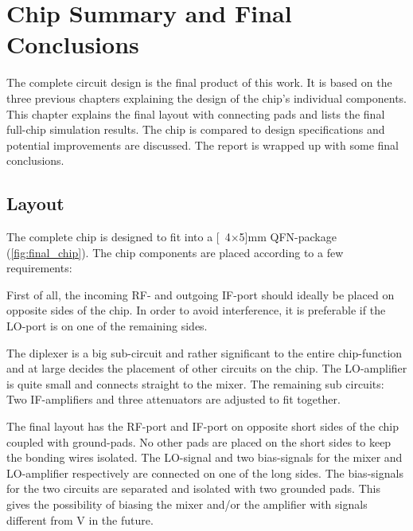 \chapter{Chip Summary and Final Conclusions}
	
		The complete circuit design is the final product of this work. It is based on the three previous chapters explaining the design of the chip's individual components. This chapter explains the final layout with connecting pads and lists the final full-chip simulation results. The chip is compared to design specifications and potential improvements are discussed. The report is wrapped up with some final conclusions.
		

	\section{Layout}
		The complete chip is designed to fit into a \unit[4$\times$5]{mm} QFN-package (\autoref{fig:final_chip}). The chip components are placed according to a few requirements:

		First of all, the incoming RF- and outgoing IF-port should ideally be placed on opposite sides of the chip. In order to avoid interference, it is preferable if the LO-port is on one of the remaining sides. %

		The diplexer is a big sub-circuit and rather significant to the entire chip-function and at large decides the placement of other circuits on the chip. The LO-amplifier is quite small and connects straight to the mixer. The remaining sub circuits: Two IF-amplifiers and three attenuators are adjusted to fit together.

		The final layout has the RF-port and IF-port on opposite short sides of the chip coupled with ground-pads. No other pads are placed on the short sides to keep the bonding wires isolated. The LO-signal and two bias-signals for the mixer and LO-amplifier respectively are connected on one of the long sides. The bias-signals for the two circuits are separated and isolated with two grounded pads. This gives the possibility of biasing the mixer and/or the amplifier with signals different from \unit[5]{V} in the future.
	
